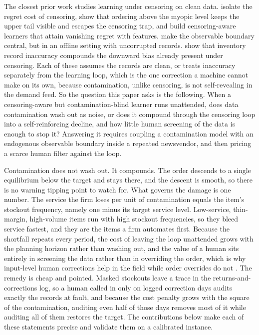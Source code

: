 \documentclass[11pt]{article}
\theoremstyle{plain}
\begin{document}
The closest prior work studies learning under censoring on clean data.
\citet{besbes2013implications} isolate the regret cost of censoring,
\citet{lariviere1999stalking} show that ordering above the myopic level keeps the
upper tail visible and escapes the censoring trap, and \citet{ding2024feature}
build censoring-aware learners that attain vanishing regret with features.
\citet{hssaine2024datadriven} make the observable boundary central, but in an
offline setting with uncorrupted records. \citet{mersereau2015censored} show that
inventory record inaccuracy compounds the downward bias already present under
censoring. Each of these assumes the records are clean, or treats inaccuracy
separately from the learning loop, which is the one correction a machine cannot
make on its own, because contamination, unlike censoring, is not self-revealing
in the demand feed. So the question this paper asks is the following. When a
censoring-aware but contamination-blind learner runs unattended, does data
contamination wash out as noise, or does it compound through the censoring loop
into a self-reinforcing decline, and how little human screening of the data is
enough to stop it? Answering it requires coupling a contamination model with an
endogenous observable boundary inside a repeated newsvendor, and then pricing a
scarce human filter against the loop.

Contamination does not wash out. It compounds. The order descends to a single
equilibrium below the target and stays there, and the descent is smooth, so there
is no warning tipping point to watch for. What governs the damage is one number.
The service the firm loses per unit of contamination equals the item's stockout
frequency, namely one minus its target service level. Low-service, thin-margin,
high-volume items run with high stockout frequencies, so they bleed service
fastest, and they are the items a firm automates first. Because the shortfall
repeats every period, the cost of leaving the loop unattended grows with the
planning horizon rather than washing out, and the value of a human sits entirely
in screening the data rather than in overriding the order, which is why
input-level human corrections help in the field while order overrides do not
\citep{kesavan2025judgmental}. The remedy is cheap and pointed. Masked stockouts
leave a trace in the returns-and-corrections log, so a human called in only on
logged correction days audits exactly the records at fault, and because the cost
penalty grows with the square of the contamination, auditing even half of those
days removes most of it while auditing all of them restores the target. The
contributions below make each of these statements precise and validate them on a
calibrated instance.
\end{document}
